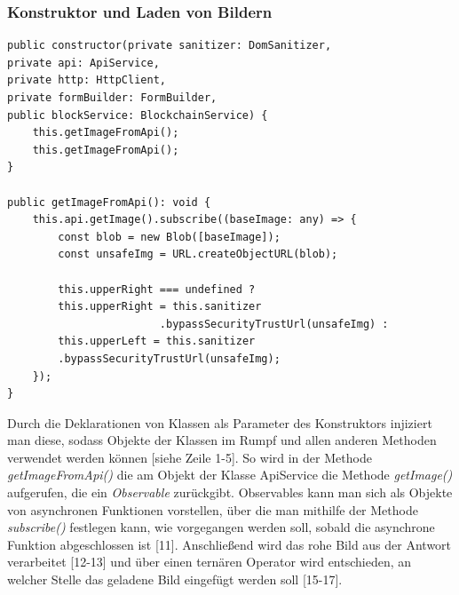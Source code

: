 \subsubsection{Konstruktor und Laden von Bildern}
\begin{lstlisting}
public constructor(private sanitizer: DomSanitizer,
private api: ApiService,
private http: HttpClient,
private formBuilder: FormBuilder,
public blockService: BlockchainService) {
	this.getImageFromApi();
	this.getImageFromApi();
}

public getImageFromApi(): void {
	this.api.getImage().subscribe((baseImage: any) => {
		const blob = new Blob([baseImage]);
		const unsafeImg = URL.createObjectURL(blob);
		
		this.upperRight === undefined ?
		this.upperRight = this.sanitizer
						.bypassSecurityTrustUrl(unsafeImg) :
		this.upperLeft = this.sanitizer
		.bypassSecurityTrustUrl(unsafeImg);
	});
}
\end{lstlisting}
Durch die Deklarationen von Klassen als Parameter des Konstruktors injiziert man diese, sodass Objekte der Klassen im Rumpf und allen anderen Methoden verwendet werden können [siehe Zeile 1-5]. So wird in der Methode \emph{getImageFromApi()} die am Objekt der Klasse ApiService die Methode \emph{getImage()} aufgerufen, die ein \emph{Observable} zurückgibt. Observables kann man sich als Objekte von asynchronen Funktionen vorstellen, über die man mithilfe der Methode \emph{subscribe()} festlegen kann, wie vorgegangen werden soll, sobald die asynchrone Funktion abgeschlossen ist [11]. Anschließend wird das rohe Bild aus der Antwort verarbeitet [12-13] und über einen ternären Operator wird entschieden, an welcher Stelle das geladene Bild eingefügt werden soll [15-17].
